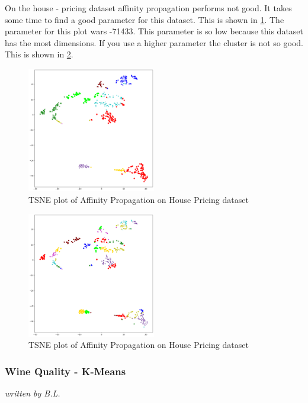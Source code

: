 On the house - pricing dataset affinity propagation performs not good. It takes some time to find a good parameter for this dataset. This is shown in  \ref{fig:af_house1}. The parameter for this plot wars -71433. This parameter is so low because this dataset has the most dimensions. If you use a higher parameter the cluster is not so good. This is shown in \ref{fig:afhouse2}.   

\begin{figure}[H]
	\caption{TSNE plot of Affinity Propagation on House Pricing dataset}
		\begin{center}
			\includegraphics[width=0.5\textwidth]{images/af_housepricing71433.png}
		\end{center}
		\label{fig:af_house1}
	\end{figure}
	
	\begin{figure}[H]
		\caption{TSNE plot of Affinity Propagation on House Pricing dataset}
			\begin{center}
				\includegraphics[width=0.5\textwidth]{images/af_housepricing6900.png}
			\end{center}
			\label{fig:afhouse2}
		\end{figure}

\subsubsection{Wine Quality - K-Means}
\textit{written by B.L.}\\

